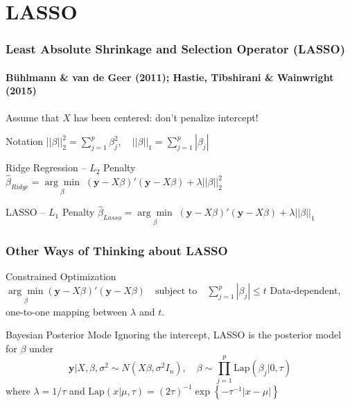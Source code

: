 \section{LASSO}
\begin{frame}
  \frametitle{Least Absolute Shrinkage and Selection Operator (LASSO)}
  \framesubtitle{B\"{u}hlmann \& van de Geer (2011); Hastie, Tibshirani \& Wainwright (2015)}

  Assume that $X$ has been centered: don't penalize intercept!

  \begin{block}{Notation}
    $\left| \left| \beta\right| \right|_2^2 = \sum_{j=1}^p \beta_j^2, \quad \left| \left| \beta\right| \right|_1 = \sum_{j=1}^p |\beta_j|$
  \end{block}

  \begin{block}{Ridge Regression -- $L_2$ Penalty}
	$\widehat{\beta}_{Ridge} =\underset{\beta}{\arg \min}\; (\mathbf{y} -  X\beta)' (\mathbf{y} - X\beta) + \lambda \left| \left| \beta\right| \right|_2^2$
  \end{block}

  \begin{block}{LASSO -- $L_1$ Penalty}
	$\widehat{\beta}_{Lasso} =\underset{\beta}{\arg \min}\; (\mathbf{y} - X\beta)' (\mathbf{y} - X\beta) + \lambda \left| \left| \beta\right| \right|_1$
  \end{block}

  
\end{frame}
\begin{frame}
  \frametitle{Other Ways of Thinking about LASSO}
  \begin{block}{Constrained Optimization}
	$\underset{\beta}{\arg \min} (\mathbf{y}  - X\beta)' (\mathbf{y} - X\beta) \quad \mbox{subject to}\quad \sum_{j=1}^p |\beta_j| \leq t$
Data-dependent, one-to-one mapping between $\lambda$ and $t$.
\end{block}

\begin{block}{Bayesian Posterior Mode}
    Ignoring the intercept, LASSO is the posterior model for $\beta$ under
		\[\mathbf{y}|X,\beta, \sigma^2 \sim N(X\beta,\sigma^2 I_n), \quad
    \beta\sim \prod_{j=1}^p \mbox{Lap}(\beta_j|0, \tau)\]
  where  
  $\lambda= 1/\tau$ and 
  $\mbox{Lap}(x|\mu,\tau)= (2\tau)^{-1}\exp\left \{-\tau^{-1}|x-\mu| \right\}$
\end{block}
\end{frame}
